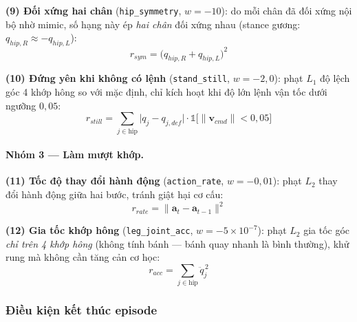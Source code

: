 \textbf{(9) Đối xứng hai chân} (\texttt{hip\_symmetry}, $w=-10$): do mỗi chân
đã đối xứng nội bộ nhờ mimic, số hạng này ép \emph{hai chân} đối xứng nhau
(stance gương: $q_{hip,R}\approx-q_{hip,L}$):
\begin{equation}
    r_{sym} = \bigl(q_{hip,R} + q_{hip,L}\bigr)^2
    \label{eq:rew_symmetry}
\end{equation}

\textbf{(10) Đứng yên khi không có lệnh} (\texttt{stand\_still}, $w=-2{,}0$):
phạt $L_1$ độ lệch góc 4 khớp hông so với mặc định, chỉ kích hoạt khi độ lớn
lệnh vận tốc dưới ngưỡng $0{,}05$:
\begin{equation}
    r_{still} = \sum_{j\in\text{hip}}\!\bigl|q_j - q_{j,def}\bigr|
    \cdot\mathbb{1}\!\bigl[\|\mathbf{v}_{cmd}\| < 0{,}05\bigr]
    \label{eq:rew_still}
\end{equation}

\paragraph{Nhóm 3 --- Làm mượt khớp.}

\textbf{(11) Tốc độ thay đổi hành động} (\texttt{action\_rate}, $w=-0{,}01$):
phạt $L_2$ thay đổi hành động giữa hai bước, tránh giật hại cơ cấu:
\begin{equation}
    r_{rate} = \|\mathbf{a}_t - \mathbf{a}_{t-1}\|^2
    \label{eq:rew_rate}
\end{equation}

\textbf{(12) Gia tốc khớp hông} (\texttt{leg\_joint\_acc},
$w=-5{\times}10^{-7}$): phạt $L_2$ gia tốc góc \emph{chỉ trên 4 khớp hông}
(không tính bánh --- bánh quay nhanh là bình thường), khử rung mà không cần
tăng cản cơ học:
\begin{equation}
    r_{acc} = \sum_{j\in\text{hip}}\ddot{q}_j^{\,2}
    \label{eq:rew_acc}
\end{equation}

\subsubsection{Điều kiện kết thúc episode}

